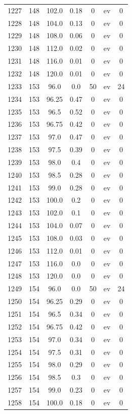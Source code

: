 \documentclass[12pt,a4paper]{article}
\begin{document}
\begin{tabular}{r|cccccc}
	1227 & 148 & 102.0 & 0.18 & 0 & ev & 0 \\
	1228 & 148 & 104.0 & 0.13 & 0 & ev & 0 \\
	1229 & 148 & 108.0 & 0.06 & 0 & ev & 0 \\
	1230 & 148 & 112.0 & 0.02 & 0 & ev & 0 \\
	1231 & 148 & 116.0 & 0.01 & 0 & ev & 0 \\
	1232 & 148 & 120.0 & 0.01 & 0 & ev & 0 \\
	1233 & 153 & 96.0 & 0.0 & 50 & ev & 24 \\
	1234 & 153 & 96.25 & 0.47 & 0 & ev & 0 \\
	1235 & 153 & 96.5 & 0.52 & 0 & ev & 0 \\
	1236 & 153 & 96.75 & 0.42 & 0 & ev & 0 \\
	1237 & 153 & 97.0 & 0.47 & 0 & ev & 0 \\
	1238 & 153 & 97.5 & 0.39 & 0 & ev & 0 \\
	1239 & 153 & 98.0 & 0.4 & 0 & ev & 0 \\
	1240 & 153 & 98.5 & 0.28 & 0 & ev & 0 \\
	1241 & 153 & 99.0 & 0.28 & 0 & ev & 0 \\
	1242 & 153 & 100.0 & 0.2 & 0 & ev & 0 \\
	1243 & 153 & 102.0 & 0.1 & 0 & ev & 0 \\
	1244 & 153 & 104.0 & 0.07 & 0 & ev & 0 \\
	1245 & 153 & 108.0 & 0.03 & 0 & ev & 0 \\
	1246 & 153 & 112.0 & 0.01 & 0 & ev & 0 \\
	1247 & 153 & 116.0 & 0.0 & 0 & ev & 0 \\
	1248 & 153 & 120.0 & 0.0 & 0 & ev & 0 \\
	1249 & 154 & 96.0 & 0.0 & 50 & ev & 24 \\
	1250 & 154 & 96.25 & 0.29 & 0 & ev & 0 \\
	1251 & 154 & 96.5 & 0.34 & 0 & ev & 0 \\
	1252 & 154 & 96.75 & 0.42 & 0 & ev & 0 \\
	1253 & 154 & 97.0 & 0.34 & 0 & ev & 0 \\
	1254 & 154 & 97.5 & 0.31 & 0 & ev & 0 \\
	1255 & 154 & 98.0 & 0.29 & 0 & ev & 0 \\
	1256 & 154 & 98.5 & 0.3 & 0 & ev & 0 \\
	1257 & 154 & 99.0 & 0.23 & 0 & ev & 0 \\
	1258 & 154 & 100.0 & 0.18 & 0 & ev & 0 \\

\end{tabular}
\end{document}
